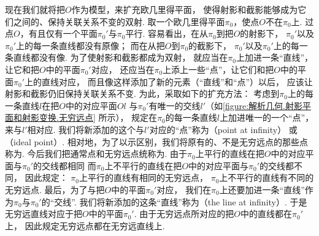 现在我们就将把\(O\)作为模型，来扩充欧几里得平面，
使得射影和截影能够成为它们之间的、保持关联关系不变的双射.
取一个欧几里得平面\(\pi_0\)，使点\(O\)不在\(\pi_0\)上.
过点\(O\)，有且仅有一个平面\(\pi_0'\)与\(\pi_0\)平行.
容易看出，在从\(\pi_0\)到把\(O\)的射影下，
\(\pi_0'\)以及\(\pi_0'\)上的每一条直线都没有原像；
而在从把\(O\)到\(\pi_0\)的截影下，
\(\pi_0'\)以及\(\pi_0'\)上的每一条直线都没有像.
为了使射影和截影都成为双射，
就应当在\(\pi_0\)上加进一条“直线”，让它和把\(O\)中的平面\(\pi_0'\)对应，
还应当在\(\pi_0\)上添上一些“点”，让它们和把\(O\)中的平面\(\pi_0'\)上的直线对应，
而且像这样添加了新的元素（“直线”和“点”）以后，
应该让射影和截影仍旧保持关联关系不变.
为此，采取如下的扩充方法：
考虑到\(\pi_0\)上的每一条直线\(l\)在把\(O\)中的对应平面\(Ol\)
与\(\pi_0'\)有唯一的交线\(l'\)（如\cref{figure:解析几何.射影平面和射影变换.无穷远点} 所示），
规定在\(\pi_0\)的每一条直线\(l\)上加进唯一的一个“点”，来与\(l'\)相对应.
我们将新添加的这个与\(l'\)对应的“点”称为（point at infinity）
或（ideal point）.
相对地，为了以示区别，我们将原有的、不是无穷远点的那些点称为.
今后我们把通常点和无穷远点统称为.
由于\(\pi_0\)上平行的直线在把\(O\)中的对应平面与\(\pi_0'\)的交线都相同
而\(\pi_0\)上不平行的直线在把\(O\)中的对应平面与\(\pi_0'\)的交线都不同，
因此规定：
\(\pi_0\)上平行的直线有相同的无穷远点，
\(\pi_0\)上不平行的直线有不同的无穷远点.
最后，为了与把\(O\)中的平面\(\pi_0'\)对应，
我们在\(\pi_0\)上还要加进一条“直线”作为\(\pi_0\)与\(\pi_0'\)的“交线”.
我们将新添加的这条“直线”称为（the line at infinity）.
于是无穷远直线对应于把\(O\)中的平面\(\pi_0'\).
由于无穷远点所对应的把\(O\)中的直线都在\(\pi_0'\)上，
因此规定无穷远点都在无穷远直线上.

